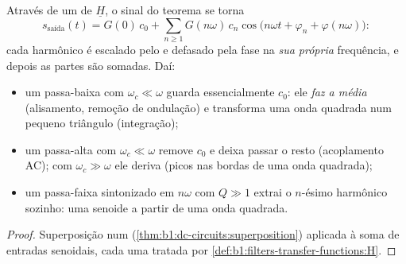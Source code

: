 \begin{proposition}\label{prop:b1:filters-transfer-functions:filtering}
Através de um  de  $\underline H$, o sinal do
teorema se torna
\[
s_{\text{saída}}(t) = G(0)\,c_0 + \sum_{n \geq 1} G(n\omega)\,c_n\cos\!\big(n\omega t + \varphi_n + \varphi(n\omega)\big):
\]
cada harmônico é escalado pelo  e defasado pela fase na
\emph{sua própria} frequência, e depois as partes são somadas. Daí:
\begin{itemize}
  \item um passa-baixa com $\omega_c \ll \omega$ guarda essencialmente $c_0$:
        ele \emph{faz a média} (alisamento, remoção de ondulação) e transforma uma
        onda quadrada num pequeno triângulo (integração);
  \item um passa-alta com $\omega_c \ll \omega$ remove $c_0$ e deixa passar
        o resto (acoplamento AC); com $\omega_c \gg \omega$ ele
        deriva (picos nas bordas de uma onda quadrada);
  \item um passa-faixa sintonizado em $n\omega$ com $Q \gg 1$ extrai o
        $n$-ésimo harmônico sozinho: uma senoide a partir de uma onda quadrada.
\end{itemize}
\end{proposition}

\begin{proof}
Superposição num  (\cref{thm:b1:dc-circuits:superposition})
aplicada à soma de entradas senoidais, cada uma tratada por
\cref{def:b1:filters-transfer-functions:H}.
\end{proof}

